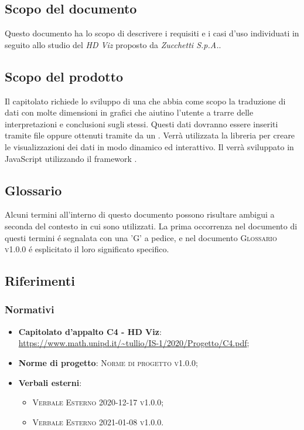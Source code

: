 \documentclass[../analisi-dei-requisiti.tex]{subfiles}
\begin{document}
\subsection{Scopo del documento}%
\label{sub:scopo_del_documento}
Questo documento ha lo scopo di descrivere i requisiti e i casi d'uso individuati in seguito allo studio del  \emph{HD Viz} proposto da \emph{Zucchetti S.p.A.}. 

\subsection{Scopo del prodotto}%
\label{sub:scopo_del_prodotto}
Il capitolato richiede lo sviluppo di una  che abbia come scopo la 
traduzione di dati con molte dimensioni in grafici che aiutino l’utente a trarre delle interpretazioni e conclusioni sugli stessi. 
Questi dati dovranno essere inseriti tramite file  oppure ottenuti tramite  da un .
Verrà utilizzata la libreria   per creare le visualizzazioni dei dati in modo dinamico ed interattivo.
Il  verrà sviluppato in JavaScript utilizzando il framework . 


\subsection{Glossario}
\label{sub:glossario}
Alcuni termini all'interno di questo documento possono risultare ambigui a seconda del contesto in cui sono utilizzati.
La prima occorrenza nel documento di questi termini é segnalata con una 'G' a pedice, e nel documento 
\textsc{Glossario v1.0.0} é esplicitato il loro significato specifico.


\subsection{Riferimenti}
\label{sub:riferimenti}

\subsubsection{Normativi}%
\label{ssub:normativi}


\begin{itemize}
  \item \textbf{Capitolato d'appalto C4 - HD Viz}: \\
  \url{https://www.math.unipd.it/~tullio/IS-1/2020/Progetto/C4.pdf};
  \item \textbf{Norme di progetto}: \textsc{Norme di progetto v1.0.0};
  \item \textbf{Verbali esterni}:
  \begin{itemize}
    \item \textsc{Verbale Esterno 2020-12-17 v1.0.0};
    \item \textsc{Verbale Esterno 2021-01-08 v1.0.0}.
  \end{itemize}
\end{itemize}
\end{document}
